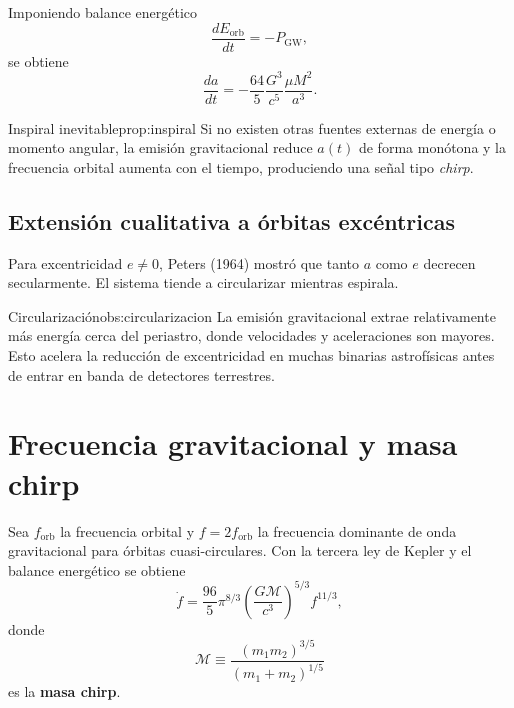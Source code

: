 Imponiendo balance energético
\begin{equation}
  \frac{dE_{\mathrm{orb}}}{dt}=-P_{\mathrm{GW}},
\end{equation}
se obtiene
\begin{equation}
  \frac{da}{dt}=-\frac{64}{5}\frac{G^3}{c^5}\frac{\mu M^2}{a^3}.
  \label{eq:da_dt_circular}
\end{equation}

\begin{proposicion}{Inspiral inevitable}{prop:inspiral}
Si no existen otras fuentes externas de energía o momento angular, la emisión gravitacional reduce $a(t)$ de forma monótona y la frecuencia orbital aumenta con el tiempo, produciendo una señal tipo \emph{chirp}.
\end{proposicion}

\subsection{Extensión cualitativa a órbitas excéntricas}

Para excentricidad $e\neq0$, Peters (1964) mostró que tanto $a$ como $e$ decrecen secularmente. El sistema tiende a circularizar mientras espirala.

\begin{observacion}{Circularización}{obs:circularizacion}
La emisión gravitacional extrae relativamente más energía cerca del periastro, donde velocidades y aceleraciones son mayores. Esto acelera la reducción de excentricidad en muchas binarias astrofísicas antes de entrar en banda de detectores terrestres.
\end{observacion}

\section{Frecuencia gravitacional y masa chirp}
\label{sec:chirp_mass}

Sea $f_{\mathrm{orb}}$ la frecuencia orbital y $f=2f_{\mathrm{orb}}$ la frecuencia dominante de onda gravitacional para órbitas cuasi-circulares. Con la tercera ley de Kepler y el balance energético se obtiene
\begin{equation}
  \dot f=
  \frac{96}{5}\pi^{8/3}
  \left(\frac{G\mathcal{M}}{c^3}\right)^{5/3}
  f^{11/3},
  \label{eq:fdot_chirp}
\end{equation}
donde
\begin{equation}
  \mathcal{M}\equiv
  \frac{(m_1m_2)^{3/5}}{(m_1+m_2)^{1/5}}
\end{equation}
es la \textbf{masa chirp}.

